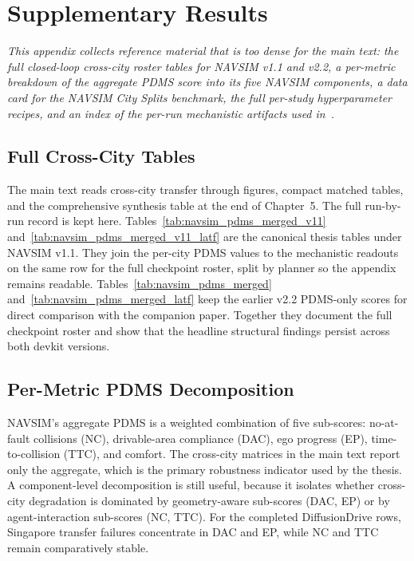 \chapter{Supplementary Results\label{chap:append}}

\textit{This appendix collects reference material that is too dense for the main text: the full closed-loop cross-city roster tables for NAVSIM v1.1 and v2.2, a per-metric breakdown of the aggregate PDMS score into its five NAVSIM components, a data card for the NAVSIM City Splits benchmark, the full per-study hyperparameter recipes, and an index of the per-run mechanistic artifacts used in~.}

\section{Full Cross-City Tables}
\label{app:cross-city-matrices}

The main text reads cross-city transfer through figures, compact matched tables, and the comprehensive synthesis table at the end of Chapter~5. The full run-by-run record is kept here. Tables~\ref{tab:navsim_pdms_merged_v11} and~\ref{tab:navsim_pdms_merged_v11_latf} are the canonical thesis tables under NAVSIM v1.1. They join the per-city PDMS values to the mechanistic readouts on the same row for the full checkpoint roster, split by planner so the appendix remains readable. Tables~\ref{tab:navsim_pdms_merged} and~\ref{tab:navsim_pdms_merged_latf} keep the earlier v2.2 PDMS-only scores for direct comparison with the companion paper. Together they document the full checkpoint roster and show that the headline structural findings persist across both devkit versions.




\section{Per-Metric PDMS Decomposition}
\label{app:per-metric}

NAVSIM's aggregate PDMS is a weighted combination of five sub-scores: no-at-fault collisions (NC), drivable-area compliance (DAC), ego progress (EP), time-to-collision (TTC), and comfort. The cross-city matrices in the main text report only the aggregate, which is the primary robustness indicator used by the thesis. A component-level decomposition is still useful, because it isolates whether cross-city degradation is dominated by geometry-aware sub-scores (DAC, EP) or by agent-interaction sub-scores (NC, TTC). For the completed DiffusionDrive rows, Singapore transfer failures concentrate in DAC and EP, while NC and TTC remain comparatively stable.

